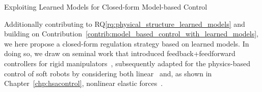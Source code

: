 \begin{contribution}\label{contrib:model_based_control_with_learned_models}
    Exploiting Learned Models for Closed-form Model-based Control
\end{contribution}
Additionally contributing to \gls{RQ}\ref{rq:physical_structure_learned_models} and building on Contribution~\ref{contrib:model_based_control_with_learned_models}, we here propose a closed-form regulation strategy based on learned models. In doing so, we draw on seminal work that introduced feedback+feedforward controllers for rigid manipulators~\cite{kelly1996class, kelly1997pd, kelly1998global, sciavicco2012modelling}, subsequently adapted for the physics-based control of soft robots by considering both linear~\cite{della2020model, della2023model} and, as shown in Chapter~\ref{chp:hsacontrol}, nonlinear elastic forces~\cite{borja2022energy}.
